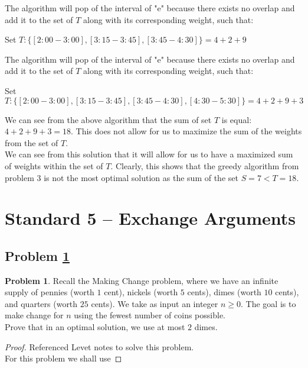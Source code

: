 \documentclass[11pt]{article}
\theoremstyle{definition}
\theoremstyle{definition}
\newtheorem{required}{Problem}
\theoremstyle{definition}
\begin{document}
The algorithm will pop of the interval of "e" because there exists no overlap and add it to the set of $T$ along with its corresponding weight, such that: \\
\begin{center}
Set $T: \{[2:00 - 3:00], [3:15 - 3:45], [3:45 - 4:30]\} = 4 + 2 + 9$\\
\end{center}
The algorithm will pop of the interval of "e" because there exists no overlap and add it to the set of $T$ along with its corresponding weight, such that: \\
\begin{center}
Set $T: \{[2:00 - 3:00], [3:15 - 3:45], [3:45 - 4:30], [4:30 - 5:30]\} = 4 + 2 + 9 + 3$\\
\end{center}
We can see from the above algorithm that the sum of set $T$ is equal: $4 + 2 + 9 + 3 = 18$. This does not allow for us to maximize the sum of the weights from the set of $T$. \\
We can see from this solution that it will allow for us to have a maximized sum of weights within the set of $T$. Clearly, this shows that the greedy algorithm from problem 3 is not the most optimal solution as the sum of the set $S = 7 < T = 18$. 


\newpage
\section{Standard 5 -- Exchange Arguments}
\setcounter{subsection}{4}
\subsection{Problem \ref{Exchange1}}
\begin{required} \label{Exchange1}
Recall the Making Change problem, where we have an infinite supply of pennies (worth $1$ cent), nickels (worth $5$ cents), dimes (worth $10$ cents), and quarters (worth $25$ cents). We take as input an integer $n \geq 0$. The goal is to make change for $n$ using the fewest number of coins possible. \\

\noindent Prove that in an optimal solution, we use at most $2$ dimes. 
\end{required}

\begin{proof} Referenced Levet notes to solve this problem. \\
For this problem we shall use 
\end{proof}
\end{document}
